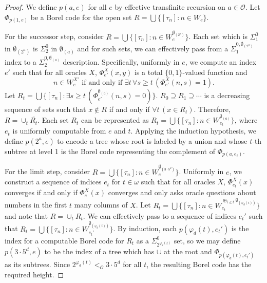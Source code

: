 \documentclass{amsart}
\theoremstyle{definition}
\theoremstyle{remark}
\newcommand{\kO}{\mathcal{O}}
\begin{document}
\begin{proof}
We define $p(a,e)$ for all $e$ by effective transfinite recursion on
$a \in \mathcal{O}$. Let
$\Phi_{p(1,e)}$ be a Borel code for the open set $R = \bigcup \{
[\tau_n] : n \in W_e \}$.

For the successor step, consider 
$R = \bigcup \{ [\tau_n] : n \in W_e^{\emptyset_{(2^a)}} \}$.
Each set which is
$\Sigma^0_1$ in $\emptyset_{(2^a)}$ is $\Sigma^0_2$ in $\emptyset_{(a)}$ and for such sets, we can effectively pass from a $\Sigma^{0,\emptyset_{(2^a)}}_1$ index to a
$\Sigma^{0,\emptyset_{(a)}}_2$ description. Specifically, uniformly in $e$, we compute an index $e'$ such that for all oracles $X$,
$\Phi_{e'}^X(x,y)$ is a total $\{ 0,1 \}$-valued function and 
\[
n \in W_e^{X'} \text{ if and only if } \exists t \,
\forall s \geq t \, ( \Phi_{e'}^X(n, s) = 1).
\]
Let $R_t = \bigcup \{ [\tau_n] : \exists s \geq t \, (\Phi_{e'}^{\emptyset_{(a)}}(n,s)=0)\}$. 
$R_0 \supseteq R_1 \supseteq \cdots$ is a decreasing sequence of sets such that $x \not \in R$ if and only if 
$\forall t \, (x \in R_t)$. Therefore, $R = \cup_t \overline{R_t}$. Each set $R_t$ can be represented as 
$R_t = \bigcup \{ [\tau_n] : n \in W_{e_t}^{\emptyset_{(a)}} \}$, where $e_t$ is uniformly computable from $e$ and $t$.
Applying the induction hypothesis, we define $p(2^a,e)$ to encode a tree whose root is labeled by a union and whose $t$-th subtree at level 1 is the Borel code 
representing the complement of $\Phi_{p(a,e_t)}$.

For the limit step, consider $R = \bigcup \{ [\tau_n] : n \in W_e^{\emptyset_{(3 \cdot 5^d)}} \}$. Uniformly in $e$, we construct a sequence of indices
$e_t$ for $t \in \omega$ such that for all oracles $X$, $\Phi_{e_t}^X(x)$ converges if and only if $\Phi_e^X(x)$ converges and
only asks oracle questions about numbers in the first $t$ many columns of $X$. Let $R_t = \bigcup \{ [\tau_n] : n \in W_{e_t}^{\oplus_{i \leq t} \emptyset_{(\varphi_d(i))}} \}$ 
and note that $R = \cup_t R_t$.  We can effectively pass to a sequence of indices $e_t'$ such that
$R_t = \bigcup \{ [\tau_n] : n \in W_{e_t'}^{\emptyset_{(\varphi_d(t))}} \}$. By induction, each $p(\varphi_d(t),e_t')$ is the index for a computable Borel code for $R_t$ as a
$\Sigma^0_{2^{\varphi_d(t)}}$ set, so we may define $p(3 \cdot 5^d,e)$ to be the
index of a tree which has $\cup$ at the root and $\Phi_{p(\varphi_d(t),e_t')}$ as its subtrees.
Since $2^{\varphi_d(t)} <_\kO 3\cdot 5^d$ 
for all $t$, the resulting Borel code has the required height.
\end{proof}
\end{document}
